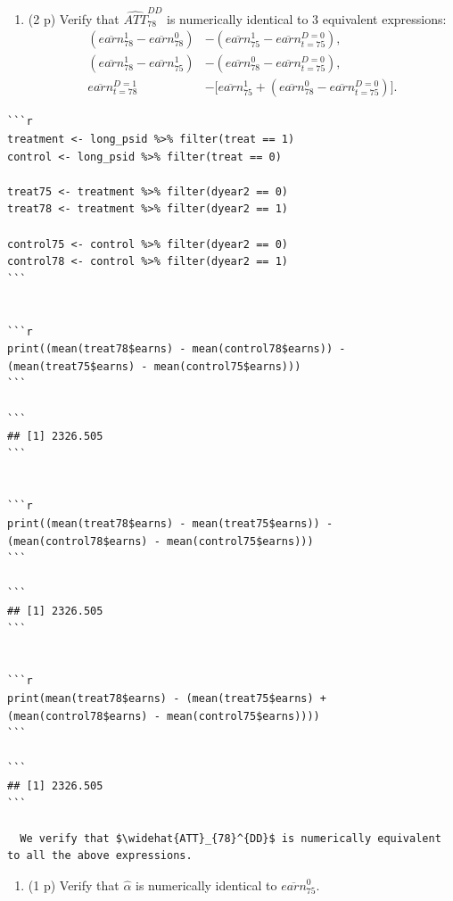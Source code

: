 \documentclass[
]{article}
\providecommand{\tightlist}{%
  \setlength{\itemsep}{0pt}\setlength{\parskip}{0pt}}
\begin{document}
\begin{enumerate}
\def\labelenumi{\alph{enumi}.}
\tightlist
\item
  (2 p) Verify that \(\widehat{ATT}_{78}^{DD}\) is numerically identical
  to 3 equivalent expressions:\label{item:DinD-diff} \begin{align}
    \left( \overline{earn}_{78}^{1}-\overline{earn}_{78}^{0}\right) &-\left( \overline{earn}_{75}^{1}-\overline{earn}_{t=75}^{D=0}\right),\label{eq:DDv1} \\
    \left( \overline{earn}_{78}^{1} -\overline{earn}_{75}^{1}\right) &-\left( \overline{earn}_{78}^{0}-\overline{earn}_{t=75}^{D=0}\right),\label{eq:DDv2} \\ 
    \overline{earn}_{t=78}^{D=1} &- \big[ \overline{earn}_{75}^{1}+ \left( \overline{earn}_{78}^{0}-\overline{earn}_{t=75}^{D=0}\right) \big].\label{eq:DDv3}
    \end{align}
\end{enumerate}

\begin{verbatim}
```r
treatment <- long_psid %>% filter(treat == 1)
control <- long_psid %>% filter(treat == 0)

treat75 <- treatment %>% filter(dyear2 == 0)
treat78 <- treatment %>% filter(dyear2 == 1)

control75 <- control %>% filter(dyear2 == 0)
control78 <- control %>% filter(dyear2 == 1)
```


```r
print((mean(treat78$earns) - mean(control78$earns)) - (mean(treat75$earns) - mean(control75$earns)))
```

```
## [1] 2326.505
```
  

```r
print((mean(treat78$earns) - mean(treat75$earns)) - (mean(control78$earns) - mean(control75$earns)))
```

```
## [1] 2326.505
```


```r
print(mean(treat78$earns) - (mean(treat75$earns) + (mean(control78$earns) - mean(control75$earns))))
```

```
## [1] 2326.505
```

  We verify that $\widehat{ATT}_{78}^{DD}$ is numerically equivalent to all the above expressions. 
\end{verbatim}

\begin{enumerate}
\def\labelenumi{\alph{enumi}.}
\setcounter{enumi}{1}
\tightlist
\item
  (1 p) Verify that \(\hat{\alpha}\) is numerically identical to
  \(\overline{earn}_{75}^{0}\).
\end{enumerate}
\end{document}

